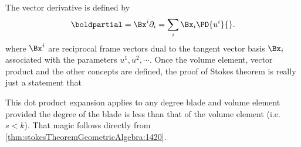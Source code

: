 %
%

The vector derivative is defined by
%
\begin{equation}\label{eqn:stokesTheoremGeometricAlgebra:1400}
\boldpartial = \Bx^i \partial_i = \sum_i \Bx_i \PD{u^i}{}.
\end{equation}
%
where \( \Bx^i \) are reciprocal frame vectors dual to the tangent vector basis \( \Bx_i \) associated with the parameters \( u^1, u^2, \cdots \).  
Once the volume element, vector product and the other concepts are defined, the proof of
Stokes theorem is really just a statement that


This dot product expansion applies to any degree blade and volume element provided the degree of the blade is less than that of the volume element (i.e. \(s < k\)).  That magic follows directly from \cref{thm:stokesTheoremGeometricAlgebra:1420}.

